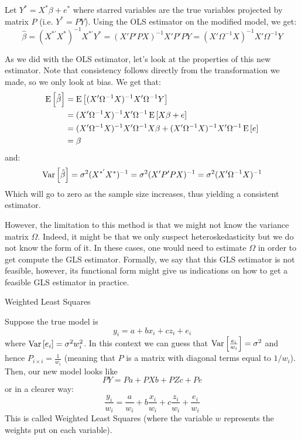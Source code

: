 Let $Y^* = X^*\beta + e^*$ where starred variables are the true variables projected by matrix $P$ (i.e. $Y^* = PY$). Using the OLS estimator on the modified model, we get: $$\hat\beta = (X^{*'}X^*)^{-1}X^{*'}Y^* = (X'P'PX)^{-1}X'P'PY = (X'\Omega^{-1}X)^{-1}X'\Omega^{-1} Y $$

As we did with the OLS estimator, let's look at the properties of this new estimator. Note that consistency follows directly from the transformation we made, so we only look at bias. We get that: \begin{align*} 
\operatorname{E}\left[\hat\beta\right] & = \operatorname{E}\left[(X'\Omega^{-1} X)^{-1}X'\Omega^{-1} Y\right] \\ 
& = (X'\Omega^{-1} X)^{-1}X'\Omega^{-1}\operatorname{E}\left[X\beta + e\right] \\
& = (X'\Omega^{-1} X)^{-1}X'\Omega^{-1}X\beta + (X'\Omega^{-1} X)^{-1}X'\Omega^{-1}\operatorname{E}\left[e\right] \\
& = \beta
\end{align*}
and:\begin{align*}
\operatorname{Var}\left[\hat\beta\right] = \sigma^2(X^{*'}X^*)^{-1} = \sigma^2(X'P'PX)^{-1} = \sigma^2(X'\Omega^{-1} X)^{-1}
\end{align*} 
Which will go to zero as the sample size increases, thus yielding a consistent estimator.

However, the limitation to this method is that we might not know the variance matrix $\Omega$. Indeed, it might be that we only suspect heteroskedasticity but we do not know the form of it. In these cases, one would need to estimate $\Omega$ in order to get compute the GLS estimator. Formally, we say that this GLS estimator is not feasible, however, its functional form might give us indications on how to get a feasible GLS estimator in practice.

\begin{bclogo}[couleur=blue!10, arrondi=0.1, logo=,ombre=false]{ Weighted Least Squares} 
\begin{small}
Suppose the true model is $$y_i = a + bx_i + cz_i + e_i $$ where $\operatorname{Var}\left[e_i\right] = \sigma^2w_i^2$. In this context we can guess that $\operatorname{Var}\left[\frac{e_i}{w_i}\right] = \sigma^2$ and hence $P_{i\times i} = \frac{1}{w_i}$ (meaning that $P$ is a matrix with diagonal terms equal to $1/w_i$). Then, our new model looks like $$PY = Pa + PXb + PZc + Pe$$ or in a clearer way: $$\frac{y_i}{w_i} = \frac{a}{w_i} + b\frac{x_i}{w_i} + c\frac{z_i}{w_i} + \frac{e_i}{w_i} $$ This is called Weighted Least Squares (where the variable $w$ represents the weights put on each variable).
\end{small}
\end{bclogo}

